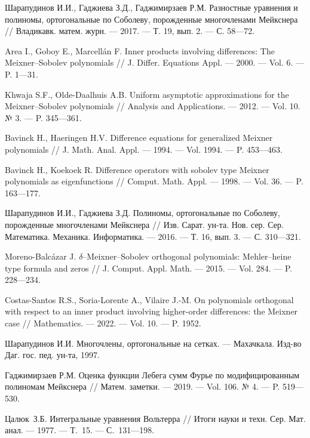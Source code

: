 \begin{thebibliography}{111}
{Шарапудинов И.И., Гаджиева З.Д., Гаджимирзаев Р.М.}
Разностные уравнения и полиномы, ортогональные по Соболеву, порожденные многочленами Мейкснера
//
Владикавк. матем. журн.
--- 2017.
--- Т. 19, вып. 2.
--- С. 58---72.

{Area I., Goboy E., Marcell\'an F.}
Inner products involving differences: The Meixner--Sobolev polynomials
//
J. Differ. Equations Appl.
--- 2000.
--- Vol. 6.
--- P. 1---31.

{Khwaja S.F., Olde-Daalhuis A.B.}
Uniform asymptotic approximations for the Meixner--Sobolev polynomials
//
Analysis and Applications.
--- 2012.
--- Vol. 10. № 3.
--- P. 345---361.

{Bavinck H., Haeringen H.V.}
Difference equations for generalized Meixner polynomials
//
J. Math. Anal. Appl.
--- 1994.
--- Vol. 1994.
--- P. 453---463.

{Bavinck H., Koekoek R.}
Difference operators with sobolev type Meixner polynomials as eigenfunctions
//
Comput. Math. Appl.
--- 1998.
--- Vol. 36.
--- P. 163---177.

{Шарапудинов И.И., Гаджиева З.Д.}
Полиномы, ортогональные по Соболеву, порожденные многочленами Мейкснера
//
Изв. Сарат. ун-та. Нов. сер. Сер. Математика. Механика. Информатика.
--- 2016.
--- Т. 16, вып. 3.
--- С. 310---321.

{Moreno-Balc\'azar J.}
$\delta$--Meixner--Sobolev orthogonal polynomials: Mehler--heine type formula and zeros
//
J. Comput. Appl. Math.
--- 2015.
--- Vol. 284.
--- P. 228---234.

{Costas-Santos R.S., Soria-Lorente A., Vilaire J.-M.}
On polynomials orthogonal with respect to an inner product involving higher-order differences: the Meixner case
//
Mathematics.
--- 2022.
--- Vol. 10.
--- P. 1952.

{Шарапудинов И.И.}
Многочлены, ортогональные на сетках. 
--- Махачкала. Изд-во Даг. гос. пед. ун-та, 1997.

{Гаджимирзаев Р.М.}
Оценка функции Лебега сумм Фурье по модифицированным полиномам Мейкснера
//
Матем. заметки.
--- 2019.
--- Vol. 106. № 4.
--- P. 519---530.



Цалюк~З.Б.
Интегральные уравнения Вольтерра
//
Итоги науки и техн. Сер. Мат. анал.
--- 1977.
--- Т.~15.
--- С.~131---198.


\end{thebibliography}
